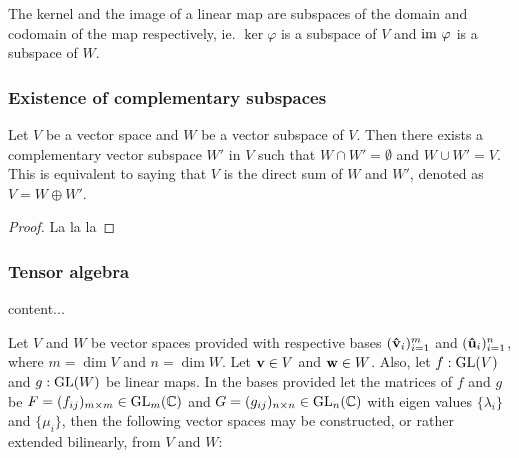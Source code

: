 	\begin{remark}
		The kernel and the image of a linear map are subspaces of the domain and codomain of the map respectively, ie. $\ker \varphi$ is a subspace of $V$ and $\text{im } \varphi$ is a subspace of $W$.
	\end{remark}
	
	\subsubsection{Existence of complementary subspaces}
	
	\begin{corollary}\label{thm:compsubspaces}
		Let $V$ be a vector space and $W$ be a vector subspace of $V$. Then there exists a complementary vector subspace $W'$ in $V$ such that $W \cap W' = \emptyset$ and $W \cup W' = V$. This is equivalent to saying that $V$ is the direct sum of $W$ and $W'$, denoted as $V = W \oplus W'$.
	\end{corollary}
	\begin{proof}
		La la la
	\end{proof}
	
	\subsubsection{Tensor algebra}\label{sect:tensoralgebra}
	
		\begin{definition}[Bilinearity]
			content...
		\end{definition}
	
		Let $V$ and $W$ be vector spaces provided with respective bases $(\mathbf{\hat{v}}_i)_{i=1}^m$ and $(\mathbf{\hat{u}}_i)_{i=1}^n$, where $m = \dim V$ and $n = \dim W$. Let $\mathbf{v} \in V$ and $\mathbf{w} \in W$. Also, let $f: \text{GL}(V)$ and $g: \text{GL}(W)$ be linear maps. In the bases provided let the matrices of $f$ and $g$ be $F=(f_{ij})_{m \times m} \in \text{GL}_m(\mathbb{C})$ and $G = (g_{ij})_{n \times n} \in \text{GL}_n(\mathbb{C})$ with eigen values $\{\lambda_i\}$ and $\{\mu_i\}$, then the following vector spaces may be constructed, or rather extended bilinearly, from $V$ and $W$:
		
